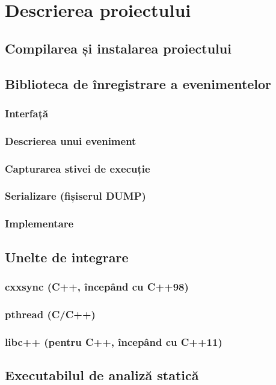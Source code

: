 \section{Descrierea proiectului}
\subsection{Compilarea și instalarea proiectului}
\subsection{Biblioteca de înregistrare a evenimentelor}
\subsubsection{Interfață}
\subsubsection{Descrierea unui eveniment}
\subsubsection{Capturarea stivei de execuție}
\subsubsection{Serializare (fișiserul DUMP)}
\subsubsection{Implementare}
\subsection{Unelte de integrare}
\subsubsection{cxxsync (C++, începând cu C++98)}
\subsubsection{pthread (C/C++)}
\subsubsection{libc++ (pentru C++, începând cu C++11)}
\subsection{Executabilul de analiză statică}
